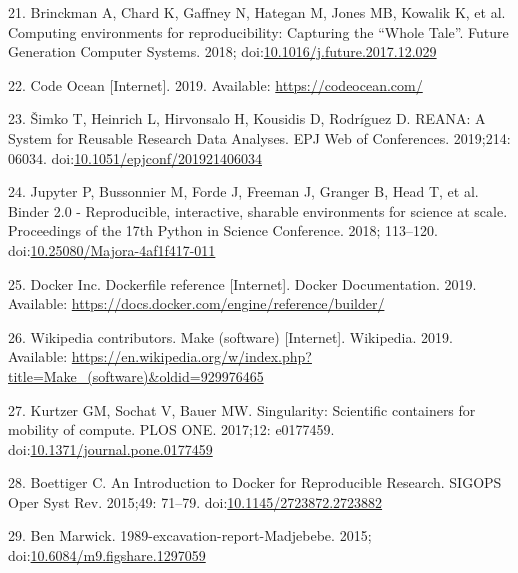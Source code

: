 \documentclass[10pt,letterpaper]{article}
\begin{document}
\leavevmode\hypertarget{ref-brinckman_computing_2018}{}%
21. Brinckman A, Chard K, Gaffney N, Hategan M, Jones MB, Kowalik K, et
al. Computing environments for reproducibility: Capturing the ``Whole
Tale''. Future Generation Computer Systems. 2018;
doi:\href{https://doi.org/10.1016/j.future.2017.12.029}{10.1016/j.future.2017.12.029}

\leavevmode\hypertarget{ref-code_ocean_2019}{}%
22. Code Ocean {[}Internet{]}. 2019. Available:
\url{https://codeocean.com/}

\leavevmode\hypertarget{ref-simko_reana_2019}{}%
23. Šimko T, Heinrich L, Hirvonsalo H, Kousidis D, Rodríguez D. REANA: A
System for Reusable Research Data Analyses. EPJ Web of Conferences.
2019;214: 06034.
doi:\href{https://doi.org/10.1051/epjconf/201921406034}{10.1051/epjconf/201921406034}

\leavevmode\hypertarget{ref-jupyter_binder_2018}{}%
24. Jupyter P, Bussonnier M, Forde J, Freeman J, Granger B, Head T, et
al. Binder 2.0 - Reproducible, interactive, sharable environments for
science at scale. Proceedings of the 17th Python in Science Conference.
2018; 113--120.
doi:\href{https://doi.org/10.25080/Majora-4af1f417-011}{10.25080/Majora-4af1f417-011}

\leavevmode\hypertarget{ref-docker_inc_dockerfile_2019}{}%
25. Docker Inc. Dockerfile reference {[}Internet{]}. Docker
Documentation. 2019. Available:
\url{https://docs.docker.com/engine/reference/builder/}

\leavevmode\hypertarget{ref-wikipedia_contributors_make_2019}{}%
26. Wikipedia contributors. Make (software) {[}Internet{]}. Wikipedia.
2019. Available:
\url{https://en.wikipedia.org/w/index.php?title=Make_(software)\&oldid=929976465}

\leavevmode\hypertarget{ref-kurtzer_singularity_2017}{}%
27. Kurtzer GM, Sochat V, Bauer MW. Singularity: Scientific containers
for mobility of compute. PLOS ONE. 2017;12: e0177459.
doi:\href{https://doi.org/10.1371/journal.pone.0177459}{10.1371/journal.pone.0177459}

\leavevmode\hypertarget{ref-boettiger_introduction_2015}{}%
28. Boettiger C. An Introduction to Docker for Reproducible Research.
SIGOPS Oper Syst Rev. 2015;49: 71--79.
doi:\href{https://doi.org/10.1145/2723872.2723882}{10.1145/2723872.2723882}

\leavevmode\hypertarget{ref-marwick_madjebebe_2015}{}%
29. Ben Marwick. 1989-excavation-report-Madjebebe. 2015;
doi:\href{https://doi.org/10.6084/m9.figshare.1297059}{10.6084/m9.figshare.1297059}
\end{document}
